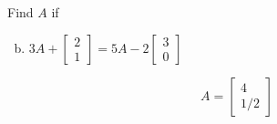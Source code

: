 \documentclass[../main.tex]{subfiles}
\begin{document}
Find $A$ if
\begin{enumerate}[a)]
	\setcounter{enumi}{1}
	\item
		$
			3A
			+
			\left[\begin{array}{r}
				2 \\
				1
			\end{array}\right]
			=
			5A
			-
			2
			\left[\begin{array}{r}
				3 \\
				0
			\end{array}\right]
		$
\end{enumerate}

\solution

\[A = \left[\begin{array}{r}
        4 \\
        1/2
    \end{array}\right]
\]  
\end{document}

